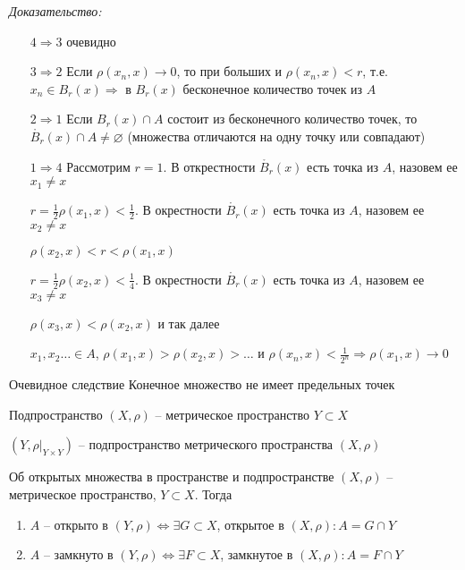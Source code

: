 \documentclass[12pt]{article}
\begin{document}
\textit{Доказательство:}

\begin{enumerate}
    \item[$4 \Rightarrow 3$] очевидно
    \item[$3 \Rightarrow 2$] Если $\rho(x_n, x) \to 0$, то при больших и $\rho(x_n, x) < r$, т.е. $x_n \in B_r(x) \Rightarrow$ в $B_r(x)$ бесконечное количество точек из $A$
    \item[$2 \Rightarrow 1$] Если $B_r(x) \cap A$ состоит из бесконечного количество точек, то $\mathring{B_r}(x) \cap A \neq \varnothing$ (множества отличаются на одну точку или совпадают)
    \item[$1 \Rightarrow 4$] Рассмотрим $r = 1$. В открестности $\mathring{B_r}(x)$ есть точка из $A$, назовем ее $x_1 \neq x$
    
    $r = \frac{1}{2}\rho(x_1, x) < \frac{1}{2}$. В окрестности $\mathring{B_r}(x)$ есть точка из $A$, назовем ее $x_2 \neq x$

    $\rho(x_2, x) < r < \rho(x_1, x)$

    $r = \frac{1}{2}\rho(x_2, x) < \frac{1}{4}$. В окрестности $\mathring{B_r}(x)$ есть точка из $A$, назовем ее $x_3 \neq x$

    $\rho(x_3, x) < \rho(x_2, x)$ и так далее

    $x_1, x_2 \ldots \in A$, $\rho(x_1, x) > \rho(x_2, x) > \ldots$ и $\rho(x_n, x) < \frac{1}{2^n} \Rightarrow \rho(x_1, x) \to 0$
\end{enumerate}

\begin{theo}{Очевидное следствие}
    Конечное множество не имеет предельных точек
\end{theo}

\begin{defin}{Подпространство}
    $(X, \rho)$ -- метрическое пространство $Y \subset X$

    $(Y, \rho|_{Y \times Y})$ -- подпространство метрического пространства $(X, \rho)$
\end{defin}

\begin{theo}{Об открытых множества в пространстве и подпространстве}
    $(X, \rho)$ -- метрическое пространство, $Y \subset X$. Тогда

    \begin{enumerate}
        \item $A$ -- открыто в $(Y, \rho) \Leftrightarrow \exists G \subset X$, открытое в $(X, \rho) : A = G \cap Y$
        \item $A$ -- замкнуто в $(Y, \rho) \Leftrightarrow \exists F \subset X$, замкнутое в $(X, \rho) : A = F \cap Y$
    \end{enumerate}
\end{theo}
\end{document}
